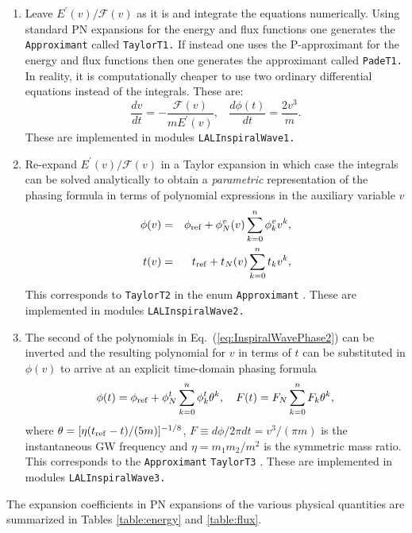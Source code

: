 \begin{enumerate}
\item Leave  $E^{\prime}(v)/\mathcal{F}(v)$ as it is and integrate the 
equations numerically. Using standard PN expansions for the
energy and flux functions one generates the {\tt Approximant} called \texttt{TaylorT1.}
If instead one uses the P-approximant for the energy and flux functions
\cite{dis3,dis1} then one generates the approximant called \texttt{PadeT1.} 
In reality, it is computationally cheaper to use two ordinary differential
equations instead of the integrals. These are:
\begin{equation}
\frac{dv}{dt} = - \frac{\mathcal{F}(v)}{m E^{\prime}(v)},\ \ \ \ 
\frac{d \phi(t)}{dt} = \frac{2v^{3}}{m}.
\label{eq:ode2}
\end{equation}
These are implemented in modules {\tt LALInspiralWave1.}
 
\item Re-expand $E^{\prime}(v)/\mathcal{F}(v)$ in a Taylor expansion
in which case the integrals can be solved analytically to obtain a 
{\it parametric} representation of the phasing formula in terms of 
polynomial expressions in the auxiliary variable $v$
\begin {eqnarray}
\phi(v)&=& \phi_{\rm ref} +
\phi^v_N (v)\sum_{k=0}^{n} {\phi}^v_k v^k, \nonumber\\
t(v)&=& t_{\rm ref} +t_N(v) \sum_{k=0}^{n} {t}_k v^k,
\label{eq:InspiralWavePhase2}
\end {eqnarray}
This corresponds to \texttt{TaylorT2} in the enum \texttt{Approximant} \cite{dis3}.
These are implemented in modules {\tt LALInspiralWave2.}
 
\item The second of the polynomials in Eq.~(\ref{eq:InspiralWavePhase2}) can
be inverted and the resulting polynomial for $v$ in terms of
$t$ can be substituted in $\phi(v)$ to arrive at an explicit  time-domain
phasing formula
\begin{equation}
\phi(t)=\phi_{\rm ref}+\phi_N^t \sum_{k=0}^{n}
{\phi}^t_k\theta^k, \ \ \ 
F(t)= F_N \sum_{k=0}^{n} {F}_k \theta^k,
\label{eq:InspiralWavePhase3}
\end{equation}         
where $\theta=[\eta (t_{\rm ref}-t)/(5m)]^{-1/8}$, 
$F \equiv d \phi/ 2 \pi dt =v^3/(\pi m)$ is the instantaneous GW frequency
and $\eta=m_1 m_2/m^2$ is the symmetric mass ratio.
This corresponds to the {\tt Approximant} \texttt{TaylorT3}  \cite{BDIWW,BIWW,dis3}.
These are implemented in modules {\tt LALInspiralWave3.}
\end{enumerate}
The expansion coefficients in PN expansions of the various physical
quantities are summarized in Tables \ref{table:energy} and \ref{table:flux}.

